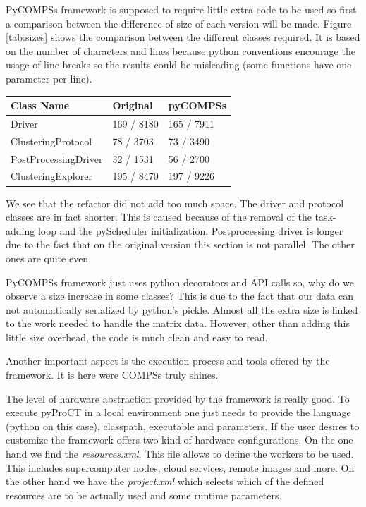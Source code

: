PyCOMPSs framework is supposed to require little extra code to be used so first a comparison between the difference of size of each version will be made. Figure \ref{tab:sizes} shows the comparison between the different classes required. It is based on the number of characters and lines because python conventions encourage the usage of line breaks so the results could be misleading (some functions have one parameter per line).


\begin{center}
	\begin{tabular}{| R{6cm} | L{3cm} | L{3cm} |}
		\hline
		Class Name & Original & pyCOMPSs \\ 
		\hline
		\hline
		Driver & 169 / 8180  &  165 / 7911 \\
		\hline
		ClusteringProtocol & 78 / 3703 & 73 / 3490 \\
		\hline
		PostProcessingDriver & 32 / 1531 & 56 / 2700 \\
		\hline
		ClusteringExplorer & 195 / 8470 & 197 / 9226 \\ 
		\hline
	\end{tabular}
	\label{tab:sizes}
\end{center}


We see that the refactor did not add too much space. The driver and protocol classes are in fact shorter. This is caused because of the removal of the task-adding loop and the pyScheduler initialization. Postprocessing driver is longer due to the fact that on the original version this section is not parallel. The other ones are quite even.

PyCOMPSs framework just uses python decorators and API calls so, why do we observe a size increase in some classes? This is due to the fact that our data can not automatically serialized by python's pickle. Almost all the extra size is linked to the work needed to handle the matrix data. However, other than adding this little size overhead, the code is much clean and easy to read. 

Another important aspect is the execution process and tools offered by the framework. It is here were COMPSs truly shines. 

The level of hardware abstraction provided by the framework is really good. To execute pyProCT in a local environment one just needs to provide the language (python on this case), classpath, executable and parameters. If the user desires to customize the framework offers two kind of hardware configurations. On the one hand we find the \textit{resources.xml}. This file allows to define the workers to be used. This includes supercomputer nodes, cloud services, remote images and more. On the other hand we have the \textit{project.xml} which selects which of the defined resources are to be actually used and some runtime parameters. 

